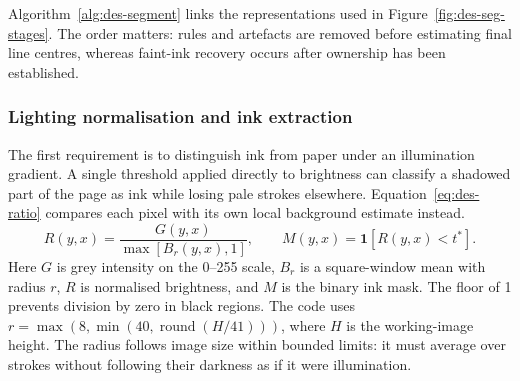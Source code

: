 Algorithm~\ref{alg:des-segment} links the representations used in Figure~\ref{fig:des-seg-stages}. The order matters: rules and artefacts are removed before estimating final line centres, whereas faint-ink recovery occurs after ownership has been established.
\begin{designalgorithm}
\caption{Photographed page to ordered line crops}
\label{alg:des-segment}
\begin{designpseudo}
\end{designpseudo}
\end{designalgorithm}

\subsubsection{Lighting normalisation and ink extraction}
The first requirement is to distinguish ink from paper under an illumination gradient. A single threshold applied directly to brightness can classify a shadowed part of the page as ink while losing pale strokes elsewhere. Equation~\ref{eq:des-ratio} compares each pixel with its own local background estimate instead.
\begin{equation}
R(y,x)=\frac{G(y,x)}{\max[B_r(y,x),1]},\qquad
M(y,x)=\mathbf{1}[R(y,x)<t^*].
\label{eq:des-ratio}
\end{equation}
Here $G$ is grey intensity on the 0--255 scale, $B_r$ is a square-window mean with radius $r$, $R$ is normalised brightness, and $M$ is the binary ink mask. The floor of 1 prevents division by zero in black regions. The code uses $r=\max(8,\min(40,\operatorname{round}(H/41)))$, where $H$ is the working-image height. The radius follows image size within bounded limits: it must average over strokes without following their darkness as if it were illumination.

